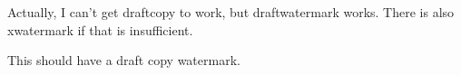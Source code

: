 \documentclass[11pt,letterpaper,draft]{article}
\begin{document}
Actually, I can't get draftcopy to work, but draftwatermark works. There is also xwatermark if that is insufficient.

This should have a draft copy watermark.

\lipsum[1-7]
\end{document}
